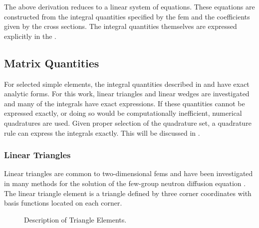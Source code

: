     The above derivation reduces to a linear system of equations. These
    equations are constructed from the integral quantities specified by the
    \gls{fem} and the coefficients given by the cross sections.  The integral
    quantities themselves are expressed explicitly in the
    .
    
  \subsection{Matrix Quantities}
    \label{sec:matrix_quantities}
    For selected simple elements, the integral quantities described in 
     and  have exact 
    analytic forms. For this work, linear triangles and linear wedges
    are investigated and many of the integrals have exact expressions. If these 
    quantities cannot be expressed exactly, or doing so would be computationally
    inefficient, numerical quadratures are used. Given proper selection of
    the quadrature set, a quadrature rule can express the integrals exactly. 
    This will be discussed in .

    \subsubsection{Linear Triangles}
      Linear triangles are common to two-dimensional \glspl{fem} and have been
      investigated in many methods for the solution of the few-group neutron
      diffusion equation \cite{Hosseini2017,Hosseini2013,Hosseini2015}.
      The linear triangle element is a triangle defined by three corner
      coordinates with basis functions located on each corner. 

      \begin{figure}
        \centering
        \vspace{0.2in}
        \caption{Description of Triangle Elements.}
        \label{fig:triangle_elements}
      \end{figure}


